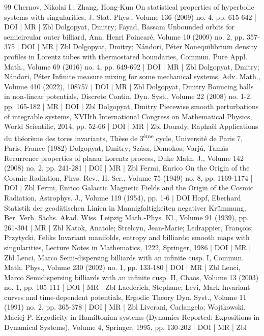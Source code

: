 \documentclass[10pt]{amsart}
\theoremstyle{definition}\newtheorem{defi}[theo]{Definition}\newtheorem{rema}[theo]{Remark}\newtheorem{exam}[theo]{Example}\newtheorem{exem}[theo]{Example}\newtheorem{nota}[theo]{Notation}
\begin{document}
\begin{thebibliography}{99}
Chernov, Nikolai I.; Zhang, Hong-Kun On statistical properties of hyperbolic systems with singularities, J. Stat. Phys., Volume 136 (2009) no. 4, pp. 615-642 | DOI | MR | Zbl
Dolgopyat, Dmitry; Fayad, Bassam Unbounded orbits for semicircular outer billiard, Ann. Henri Poincaré, Volume 10 (2009) no. 2, pp. 357-375 | DOI | MR | Zbl
Dolgopyat, Dmitry; Nándori, Péter Nonequilibrium density profiles in Lorentz tubes with thermostated boundaries, Commun. Pure Appl. Math., Volume 69 (2016) no. 4, pp. 649-692 | DOI | MR | Zbl
Dolgopyat, Dmitry; Nándori, Péter Infinite measure mixing for some mechanical systems, Adv. Math., Volume 410 (2022), 108757 | DOI | MR | Zbl
Dolgopyat, Dmitry Bouncing balls in non-linear potentials, Discrete Contin. Dyn. Syst., Volume 22 (2008) no. 1-2, pp. 165-182 | MR | DOI | Zbl
Dolgopyat, Dmitry Piecewise smooth perturbations of integrable systems, XVIIth International Congress on Mathematical Physics, World Scientific, 2014, pp. 52-66 | DOI | MR | Zbl
Douady, Raphaël Applications du théorème des tores invariants, Thèse de 3\textsuperscript{ème} cycle, Université de Paris 7, Paris, France (1982)
Dolgopyat, Dmitry; Szász, Domokos; Varjú, Tamás Recurrence properties of planar Lorentz process, Duke Math. J., Volume 142 (2008) no. 2, pp. 241-281 | DOI | MR | Zbl
Fermi, Enrico On the Origin of the Cosmic Radiation, Phys. Rev., II. Ser., Volume 75 (1949) no. 8, pp. 1169-1174 | DOI | Zbl
Fermi, Enrico Galactic Magnetic Fields and the Origin of the Cosmic Radiation, Astrophys. J., Volume 119 (1954), pp. 1-6 | DOI
Hopf, Eberhard Statistik der geodätischen Linien in Mannigfaltigkeiten negativer Krümmung, Ber. Verh. Sächs. Akad. Wiss. Leipzig Math.-Phys. Kl., Volume 91 (1939), pp. 261-304 | MR | Zbl
Katok, Anatole; Strelcyn, Jean-Marie; Ledrappier, François; Przytycki, Feliks Invariant manifolds, entropy and billiards; smooth maps with singularities, Lecture Notes in Mathematics, 1222, Springer, 1986 | DOI | MR | Zbl
Lenci, Marco Semi-dispersing billiards with an infinite cusp. I, Commun. Math. Phys., Volume 230 (2002) no. 1, pp. 133-180 | DOI | MR | Zbl
Lenci, Marco Semidispersing billiards with an infinite cusp. II, Chaos, Volume 13 (2003) no. 1, pp. 105-111 | DOI | MR | Zbl
Laederich, Stephane; Levi, Mark Invariant curves and time-dependent potentials, Ergodic Theory Dyn. Syst., Volume 11 (1991) no. 2, pp. 365-378 | DOI | MR | Zbl
Liverani, Carlangelo; Wojtkowski, Maciej P. Ergodicity in Hamiltonian systems (Dynamics Reported: Expositions in Dynamical Systems), Volume 4, Springer, 1995, pp. 130-202 | DOI | MR | Zbl

\end{thebibliography}
\end{document}
